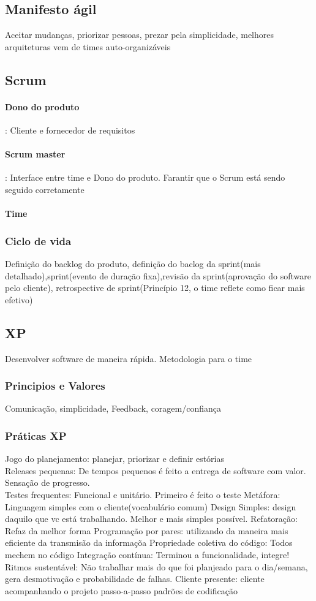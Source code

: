 \documentclass{article}
\begin{document}
\subsection{Manifesto ágil}
	Aceitar mudanças, priorizar pessoas, prezar pela simplicidade, melhores arquiteturas vem de times auto-organizáveis 
\subsection{Scrum}
\paragraph{Dono do produto}: Cliente e fornecedor de requisitos
\paragraph{Scrum master}: Interface entre time e Dono do produto. Farantir que o Scrum está sendo seguido corretamente
\paragraph{Time}

\subsubsection{Ciclo de vida}
	Definição do backlog do produto, definição do baclog da sprint(mais detalhado),sprint(evento de duração fixa),revisão da sprint(aprovação do software pelo cliente), retrospective de sprint(Princípio 12, o time reflete como ficar mais efetivo) 
\subsection{XP}
	Desenvolver software de maneira rápida. Metodologia para o time

\subsubsection{Principios e Valores}
	Comunicação, simplicidade, Feedback, coragem/confiança
\subsubsection{Práticas XP}
	Jogo do planejamento: planejar, priorizar e definir estórias\\
	Releases pequenas: De tempos pequenos é feito a entrega de software com valor. Sensação de progresso.\\
	Testes frequentes: Funcional e unitário. Primeiro é feito o teste
	Metáfora: Linguagem simples com o cliente(vocabulário comum)
	Design Simples: design daquilo que vc está trabalhando. Melhor e mais simples possível.
	Refatoração: Refaz da melhor forma
	Programação por pares: utilizando da maneira mais eficiente da transmisão da informaçõa
	Propriedade coletiva do código: Todos mechem no código
	Integração contínua: Terminou a funcionalidade, integre!
	Ritmos sustentável: Não trabalhar mais do que foi planjeado para o dia/semana, gera desmotivação e probabilidade de falhas.
	Cliente presente: cliente acompanhando o projeto passo-a-passo
	padrões de codificação
	
\end{document}
